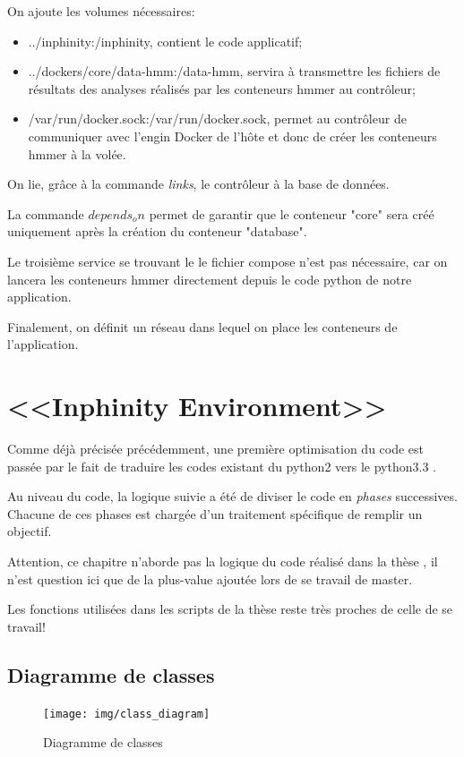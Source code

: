 On ajoute les volumes nécessaires:

\begin{itemize}
\item ../inphinity:/inphinity, contient le code applicatif;
\item ../dockers/core/data-hmm:/data-hmm, servira à transmettre les fichiers de résultats des analyses réalisés par les conteneurs hmmer au contrôleur;
\item /var/run/docker.sock:/var/run/docker.sock, permet au contrôleur de communiquer avec l'engin Docker de l'hôte et donc de créer les conteneurs hmmer à la volée.
\end{itemize}

On lie, grâce à la commande \emph{links}, le contrôleur à la base de données.

La commande \emph{$depends_on$} permet de garantir que le conteneur "core" sera créé uniquement après la création du conteneur "database".

Le troisième service se trouvant le le fichier compose n'est pas nécessaire, car on lancera les conteneurs hmmer directement depuis le code python de notre application. 

Finalement, on définit un réseau dans lequel on place les conteneurs de l'application.

\section{<<Inphinity Environment>>}

Comme déjà précisée précédemment, une première optimisation du code est passée par le fait de traduire les codes existant du python2 vers le python3.3 .

Au niveau du code, la logique suivie a été de diviser le code en \emph{phases} successives. Chacune de ces phases est chargée d'un traitement spécifique de remplir un objectif.

Attention, ce chapitre n'aborde pas la logique du code réalisé dans la thèse \thLeite , il n'est question ici que de la plus-value ajoutée lors de se travail de master.

Les fonctions utilisées dans les scripts de la thèse \thLeite reste très proches de celle de se travail!

\subsection{Diagramme de classes}
\begin{figure}[H] 
\centering 
\texttt{[image: img/class\_diagram]} 
\caption[classdiagram]{Diagramme de classes}
\label{fig:classdiagram} 
\end{figure}

